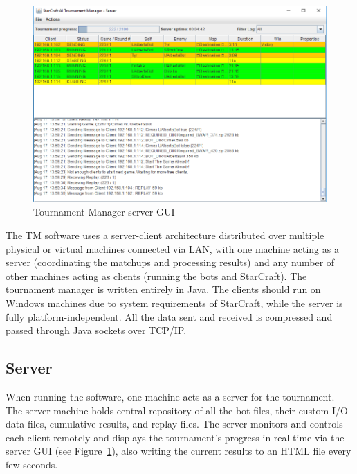 \begin{figure}[t]
  \centering
  \includegraphics[width=1\columnwidth]{fig/tournament-manager-screenshot.png}
  \caption{Tournament Manager server GUI}
  \label{tmServerGUI}
\end{figure}

The TM software uses a server-client architecture distributed over multiple physical or virtual machines connected via LAN, with one machine acting as a server (coordinating the matchups and processing results) and any number of other machines acting as clients (running the bots and StarCraft). The tournament manager is written entirely in Java. The clients should run on Windows machines due to system requirements of StarCraft, while the server is fully platform-independent. All the data sent and received is compressed and passed through Java sockets over TCP/IP.

\subsection{Server}

When running the software, one machine acts as a server for the tournament. The server machine holds central repository of all the bot files, their custom I/O data files, cumulative results, and replay files. The server monitors and controls each client remotely and displays the tournament's progress in real time via the server GUI (see Figure~\ref{tmServerGUI}), also writing the current results to an HTML file every few seconds.


